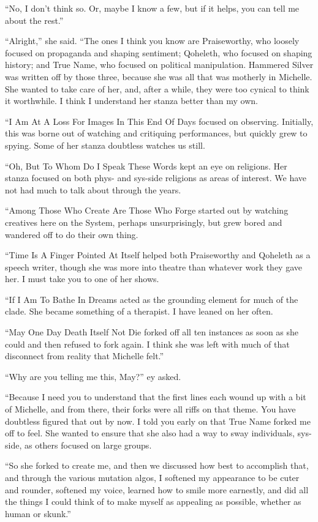 ``No, I don't think so. Or, maybe I know a few, but if it helps, you can tell me about the rest.''

``Alright,'' she said. ``The ones I think you know are Praiseworthy, who loosely focused on propaganda and shaping sentiment; Qoheleth, who focused on shaping history; and True Name, who focused on political manipulation. Hammered Silver was written off by those three, because she was all that was motherly in Michelle. She wanted to take care of her, and, after a while, they were too cynical to think it worthwhile. I think I understand her stanza better than my own.

``I Am At A Loss For Images In This End Of Days focused on observing. Initially, this was borne out of watching and critiquing performances, but quickly grew to spying. Some of her stanza doubtless watches us still.

``Oh, But To Whom Do I Speak These Words kept an eye on religions. Her stanza focused on both phys- and sys-side religions as areas of interest. We have not had much to talk about through the years.

``Among Those Who Create Are Those Who Forge started out by watching creatives here on the System, perhaps unsurprisingly, but grew bored and wandered off to do their own thing.

``Time Is A Finger Pointed At Itself helped both Praiseworthy and Qoheleth as a speech writer, though she was more into theatre than whatever work they gave her. I must take you to one of her shows.

``If I Am To Bathe In Dreams acted as the grounding element for much of the clade. She became something of a therapist. I have leaned on her often.

``May One Day Death Itself Not Die forked off all ten instances as soon as she could and then refused to fork again. I think she was left with much of that disconnect from reality that Michelle felt.''

``Why are you telling me this, May?'' ey asked.

``Because I need you to understand that the first lines each wound up with a bit of Michelle, and from there, their forks were all riffs on that theme. You have doubtless figured that out by now. I told you early on that True Name forked me off to feel. She wanted to ensure that she also had a way to sway individuals, sys-side, as others focused on large groups.

``So she forked to create me, and then we discussed how best to accomplish that, and through the various mutation algos, I softened my appearance to be cuter and rounder, softened my voice, learned how to smile more earnestly, and did all the things I could think of to make myself as appealing as possible, whether as human or skunk.''

